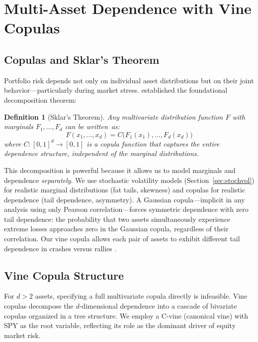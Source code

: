 \documentclass[11pt,a4paper]{article}
\newtheorem{definition}{Definition}
\begin{document}
\section{Multi-Asset Dependence with Vine Copulas}
\label{sec:copula}

\subsection{Copulas and Sklar's Theorem}
\label{sec:sklars}

Portfolio risk depends not only on individual asset distributions but on their joint behavior---particularly during market stress.
\citet{sklar1959} established the foundational decomposition theorem:

\begin{definition}[Sklar's Theorem]
Any multivariate distribution function $F$ with marginals $F_1, \ldots, F_d$ can be written~as:
\begin{equation}
\label{eq:sklar}
F(x_1, \ldots, x_d) = C\bigl(F_1(x_1), \ldots, F_d(x_d)\bigr)
\end{equation}
where $C : [0,1]^d \to [0,1]$ is a copula function that captures the entire dependence structure, independent of the marginal distributions.
\end{definition}

This decomposition is powerful because it allows us to model marginals and dependence \emph{separately}.
We use stochastic volatility models (Section~\ref{sec:stochvol}) for realistic marginal distributions (fat tails, skewness) and copulas for realistic dependence (tail dependence, asymmetry).
A Gaussian copula---implicit in any analysis using only Pearson correlation---forces symmetric dependence with zero tail dependence: the probability that two assets simultaneously experience extreme losses approaches zero in the Gaussian copula, regardless of their correlation.
Our vine copula allows each pair of assets to exhibit different tail dependence in crashes versus rallies \citep{nelsen2006}.

\subsection{Vine Copula Structure}
\label{sec:vine}

For $d > 2$ assets, specifying a full multivariate copula directly is infeasible.
Vine copulas \citep{aas2009} decompose the $d$-dimensional dependence into a cascade of bivariate copulas organized in a tree structure.
We employ a C-vine (canonical vine) with SPY as the root variable, reflecting its role as the dominant driver of equity market risk.
\end{document}
